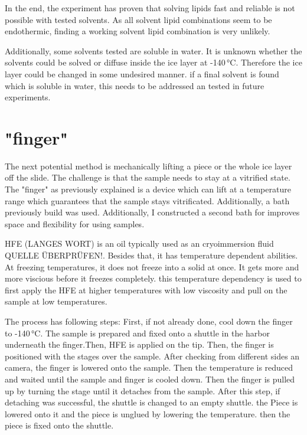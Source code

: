 In the end, the experiment has proven that solving lipids fast and reliable is not possible with tested solvents. As all solvent lipid combinations seem to be endothermic, finding a working solvent lipid combination is very unlikely.

Additionally, some solvents tested are soluble in water. It is unknown whether the solvents could be solved or diffuse inside the ice layer at -140\,°C. Therefore the ice layer could be changed in some undesired manner. if a final solvent is found which is soluble in water, this needs to be addressed an tested in future experiments.

\section{"finger"}

The next potential method is mechanically lifting a piece or the whole ice layer off the slide. The challenge is that the sample needs to stay at a vitrified state. The "finger" as previously explained is a device which can lift at a temperature range which guarantees that the sample stays vitrificated. Additionally, a bath previously build was used. Additionally, I constructed a second bath for improves space and flexibility for using samples.

HFE (LANGES WORT) is an oil typically used as an cryoimmersion fluid \cite{Faoro.2018b}QUELLE ÜBERPRÜFEN!. Besides that, it has temperature dependent abilities. At freezing temperatures, it does not freeze into a solid at once. It gets more and more viscious before it freezes completely. this temperature dependency is used to first apply the HFE at higher temperatures with low viscosity and pull on the sample at low temperatures.

The process has following steps: First, if not already done, cool down the finger to -140\,°C. The sample is prepared and fixed onto a shuttle in the harbor underneath  the finger.Then, HFE is applied on the tip. Then, the finger is positioned with the stages over the sample. After checking from different sides an camera, the finger is lowered onto the sample. Then the temperature is reduced and waited until the sample and finger is cooled down. Then the finger is pulled up by turning the stage until it detaches from the sample. After this step, if detaching was successful, the shuttle is changed to an empty shuttle. the Piece is lowered onto it and the piece is unglued by lowering the temperature. then the piece is fixed onto the shuttle.

